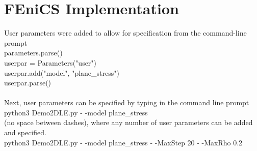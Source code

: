 \documentclass[12pt,3p]{article}
\begin{document}
\section{FEniCS Implementation}
\vspace{-2ex}
User parameters were added to allow for specification from the command-line prompt \\
{\selectfont
parameters.parse() \\
userpar = Parameters("user") \\
userpar.add("model", "plane\_stress") \\
userpar.parse() \\ \\
}
Next, user parameters can be specified by typing in the command line prompt \\
{\selectfont
python3 Demo2DLE.py - -model plane\_stress \\
}
(no space between dashes), where any number of user parameters can be added and specified. \\
{\selectfont
python3 Demo2DLE.py - -model plane\_stress - -MaxStep 20 - -MaxRho 0.2
}
\end{document}
